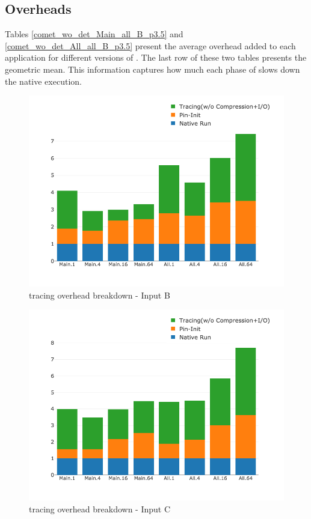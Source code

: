 \subsection{Overheads}
\label{subsec:pinit}
Tables \ref{comet_wo_det_Main_all_B_p3.5} and
\ref{comet_wo_det_All_all_B_p3.5} present the average overhead added to each
application for different versions of \parlot.
%
The last row of these two tables
presents the geometric mean.
%
This information captures how much each
phase of \parlot slows down the native execution.










\begin{figure}[t]
\centering
\includegraphics[width=.7\textwidth]{parlot/figs.comet.newMed/comet_chartDet_B_woc_byTool_p3_5.png}
\caption{\parlotnc tracing overhead breakdown - Input B}
\label{comet_chartDet_B_woc_byTool_p3_5}
\end{figure}

\begin{figure}[t]
\centering
\includegraphics[width=.7\textwidth]{parlot/figs.comet.newMed/comet_chartDet_C_woc_byTool_p3_5.png}
\caption{ \parlotnc tracing overhead breakdown - Input C}
\label{comet_chartDet_C_woc_byTool_p3_5}
\end{figure}

